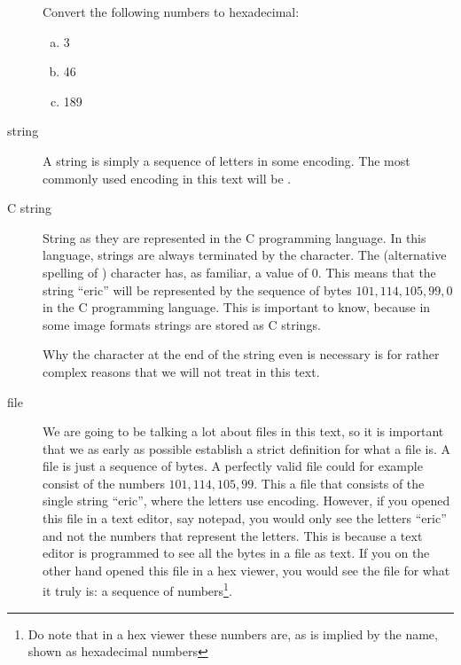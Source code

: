 \begin{description}
\begin{Exercise}[label={hex-to-n}]
  \end{Exercise}

  \begin{Exercise}[label={n-to-hex}]
    Convert the following numbers to hexadecimal:

    \begin{enumerate}[(a)]
    \item 3
    \item 46
    \item 189
    \end{enumerate}

  \end{Exercise}


\item[string] A string is simply a sequence of letters in some
  encoding. The most commonly used encoding in this text will be \ascii
  \cite{rfc20}.

\item[C string] String as they are represented in the C programming
  language. In this language, strings are always terminated by the
  \nul character\cite{kernighan1988c}. The \nullm(alternative spelling
  of \nul) character has, as familiar, a value of $0$. This means that
  the string ``eric'' will be represented by the sequence of bytes
  $101,114,105,99, 0$ in the C programming language. This is important
  to know, because in some image formats strings are stored as C
  strings.

  Why the \nullm character at the end of the string even is necessary
  is for rather complex reasons that we will not treat in this text.

\item[file] We are going to be talking a lot about files in this text,
  so it is important that we as early as possible establish a strict
  definition for what a file is. A file is just a sequence of bytes. A
  perfectly valid file could for example consist of the numbers
  $101,114,105,99$. This a file that consists of the single string
  ``eric'', where the letters use \ascii encoding. However, if you
  opened this file in a text editor, say notepad, you would only see
  the letters ``eric'' and not the numbers that represent the
  letters. This is because a text editor is programmed to see all the
  bytes in a file as text. If you on the other hand opened this file
  in a hex viewer, you would see the file for what it truly is: a
  sequence of numbers\footnote{Do note that in a hex viewer these
    numbers are, as is implied by the name, shown as hexadecimal
    numbers}.


\end{description}

